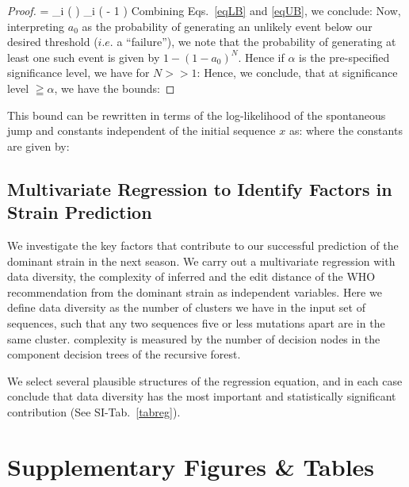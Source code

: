\documentclass[onecolumn,10pt]{IEEEtran}
\begin{document}
\begin{proof}
{  = \sum_i \log  \left  (    \right ) \leqq \sum_i \left  (  - 1 \right ) \leqq {}\theta
}%
Combining Eqs.~\ref{eqLB} and \ref{eqUB}, we conclude:
%
Now, interpreting $a_0$ as the probability of generating an unlikely event below our desired threshold ($i.e.$ a ``failure''), we note that the probability of generating at least one such event is given by $1-(1-a_0)^N$. Hence if $\alpha$ is the pre-specified significance level, we have for $N >> 1 $:
%
Hence, we conclude, that at significance level $\geqq \alpha$, we have the bounds:
%
\end{proof}
\begin{rem}
This bound can be rewritten in terms of the log-likelihood of the spontaneous jump and  constants independent of the  initial sequence $x$ as:
%
where the constants are given by:
%
\end{rem}





\subsection*{Multivariate Regression to Identify Factors in Strain Prediction}

We investigate the key factors that contribute to our successful prediction of the dominant strain in the next season. We carry out a multivariate regression with data diversity, the complexity of inferred \qnet and the edit distance of the WHO recommendation from the dominant strain as independent variables. Here we define data diversity as the number of clusters we have in the input set of sequences, such that any two sequences five or less mutations apart are in the same cluster. \qnet complexity is measured by the number of decision nodes in the component decision trees of the recursive forest.

We select several plausible structures of the regression equation, and in each case conclude that  data diversity has the most important and statistically significant contribution (See SI-Tab.~\ref{tabreg}).




\clearpage





\section*{Supplementary Figures \& Tables}


\end{document}
